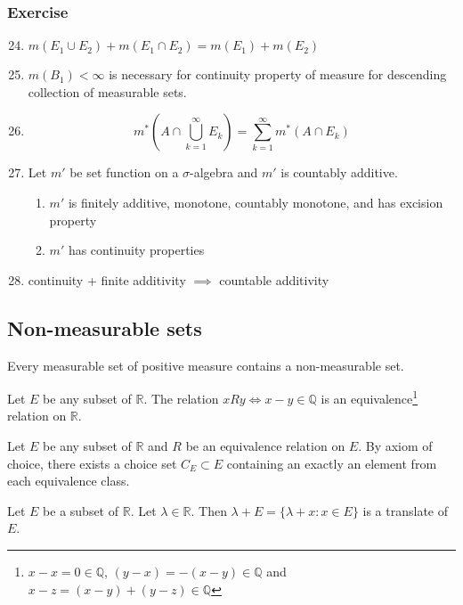 \subsubsection{Exercise}
\begin{enumerate}
	\setcounter{enumi}{23}
	\item $m(E_1 \cup E_2) + m(E_1 \cap E_2) = m(E_1) + m(E_2)$
	\item $m(B_1) < \infty$ is necessary for continuity property of measure for descending collection of measurable sets.
	\item
	\begin{equation*}
		m^\ast \left( A \cap \bigcup_{k=1}^\infty E_k \right) = \sum_{k=1}^\infty m^\ast(A \cap E_k)
	\end{equation*}
	\item Let $m'$ be set function on a $\sigma$-algebra and $m'$ is countably additive.
		\begin{enumerate}
			\item $m'$ is finitely additive, monotone, countably monotone, and has excision property
			\item $m'$ has continuity properties
		\end{enumerate}
	\item continuity + finite additivity $\implies$ countable additivity
\end{enumerate}

\subsection{Non-measurable sets}
	Every measurable set of positive measure contains a non-measurable set.
\begin{definition}
	Let $E$ be any subset of $\mathbb{R}$.
	The relation $xRy \iff x-y \in \mathbb{Q}$ is an equivalence\dag\footnote{
		$x-x = 0 \in \mathbb{Q}$, $(y-x) = -(x-y) \in \mathbb{Q}$ and $x-z = (x-y)+(y-z) \in \mathbb{Q}$}
		relation on $\mathbb{R}$.
\end{definition}

\begin{definition}
	Let $E$ be any subset of $\mathbb{R}$ and $R$ be an equivalence relation on $E$.
	By axiom of choice, there exists a choice set $C_E \subset E$ containing an exactly an element from each equivalence class.
\end{definition}

\begin{definition}[translate]
	Let $E$ be a subset of $\mathbb{R}$.
	Let $\lambda \in \mathbb{R}$.
	Then $\lambda + E = \{ \lambda + x : x \in E \}$ is a translate of $E$.
\end{definition}

